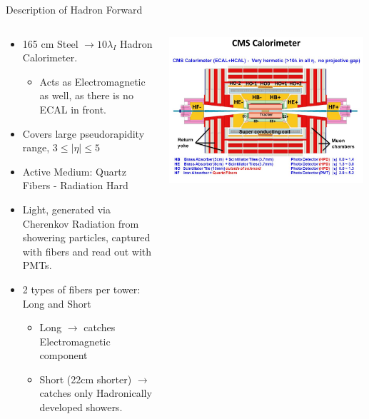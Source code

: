 \documentclass[pdf, 9pt]{beamer}
\begin{document}
  \begin{frame}{Description of Hadron Forward}
    \begin{columns}[T]
      \begin{column}{0.7\textwidth}
        \begin{itemize}
          \item 165 cm Steel $\rightarrow 10\lambda_{I}$ Hadron Calorimeter.
            \begin{itemize}
              \item Acts as Electromagnetic as well, as there is no ECAL in front.
            \end{itemize}
          \item Covers large pseudorapidity range, $3 \le |\eta| \le 5$
          \item Active Medium: Quartz Fibers - \alert{Radiation Hard}
          \item Light, generated via Cherenkov Radiation from showering particles, captured with fibers and read out with PMTs.
          \item 2 types of fibers per tower: Long and Short
            \begin{itemize}
              \item Long $\rightarrow$ catches Electromagnetic component
              \item Short (22cm shorter) $\rightarrow$ catches only Hadronically developed showers.
            \end{itemize}
        \end{itemize}
      \end{column}
      \begin{column}{0.49\textwidth}
        \includegraphics[width=0.99\textwidth, height=0.5\textheight]{figs/hf/slide_1.jpg}
      \end{column}
    \end{columns}
  \end{frame}
\end{document}
